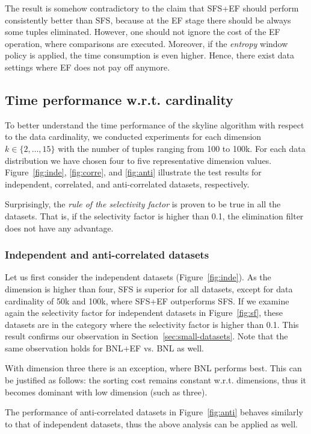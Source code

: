 The result is somehow contradictory to the claim that SFS+EF should 
perform consistently better than SFS, because at the EF stage there should be always 
some tuples eliminated. However, one should not ignore the cost of the EF operation,
where comparisons are executed. Moreover, if the \emph{entropy} window 
policy is applied, the time consumption is even higher. Hence, there exist
data settings where EF does not pay off anymore.

\subsection{Time performance w.r.t. cardinality}

To better understand the time performance of the skyline algorithm
with respect to the data cardinality, 
we conducted experiments for each dimension $k \in \{2, \ldots, 15\}$
with the number of tuples ranging from 100 to 100k. 
For each data distribution we have chosen four to five representative
dimension values.
Figure~\ref{fig:inde}, \ref{fig:corre}, and \ref{fig:anti}
illustrate the test results for independent, correlated,
and anti-correlated datasets, respectively.

Surprisingly, the \emph{rule of the selectivity factor} 
is proven to be true in all the datasets. 
That is, 
if the selectivity factor is higher than 0.1, the elimination filter
does not have any advantage. 

\subsubsection{Independent and anti-correlated datasets}
Let us first consider the independent datasets (Figure~\ref{fig:inde}).
As the dimension is higher than four, SFS is superior for all datasets,
except for data cardinality of 50k and 100k, where SFS+EF outperforms SFS.
If we examine again the selectivity factor for independent datasets in Figure~\ref{fig:sf},
these datasets are in the category where the selectivity factor 
is higher than 0.1. This result confirms our observation in Section~\ref{sec:small-datasets}.
Note that the same observation holds for BNL+EF vs. BNL as well.

With dimension three there is an exception, where BNL performs best.
This can be justified as follows: 
the sorting cost remains constant w.r.t. dimensions,
thus it becomes dominant with low dimension (such as three). 

The performance of anti-correlated datasets in Figure~\ref{fig:anti} 
behaves similarly to that of independent datasets, 
thus the above analysis can be applied as well.

